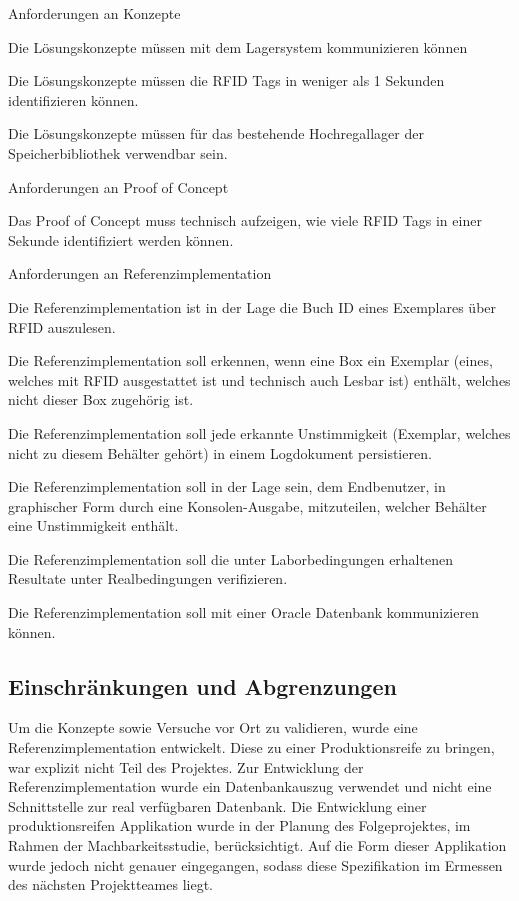 \begin{legal}
	\item Anforderungen an Konzepte
	\begin{legal}
		\item Die Lösungskonzepte müssen mit dem Lagersystem kommunizieren können
		\item Die Lösungskonzepte müssen die RFID Tags in weniger als 1 Sekunden identifizieren können.
		\item Die Lösungskonzepte müssen für das bestehende Hochregallager der Speicherbibliothek verwendbar sein.
	\end{legal}
	\item Anforderungen an Proof of Concept
	\begin{legal}
		\item Das Proof of Concept muss technisch aufzeigen, wie viele RFID Tags in einer Sekunde identifiziert werden können.
	\end{legal}
	\item Anforderungen an Referenzimplementation
	\begin{legal}
		\item Die Referenzimplementation ist in der Lage die Buch ID eines Exemplares über RFID auszulesen.
		\item Die Referenzimplementation soll erkennen, wenn eine Box ein Exemplar (eines, welches mit RFID ausgestattet ist und technisch auch Lesbar ist) enthält, welches nicht dieser Box zugehörig ist.
		\item Die Referenzimplementation soll jede erkannte Unstimmigkeit (Exemplar, welches nicht zu diesem Behälter gehört) in einem Logdokument persistieren.
		\item Die Referenzimplementation soll in der Lage sein, dem Endbenutzer, in graphischer Form durch eine Konsolen-Ausgabe, mitzuteilen, welcher Behälter eine Unstimmigkeit enthält.
		\item Die Referenzimplementation soll die unter Laborbedingungen erhaltenen Resultate unter Realbedingungen verifizieren.
		\item Die Referenzimplementation soll mit einer Oracle Datenbank kommunizieren können.
	\end{legal}
\end{legal}

\subsection{Einschränkungen und Abgrenzungen}
Um die Konzepte sowie Versuche vor Ort zu validieren, wurde eine Referenzimplementation entwickelt. Diese zu einer Produktionsreife zu bringen, war explizit nicht Teil des Projektes. Zur Entwicklung der Referenzimplementation wurde ein Datenbankauszug verwendet und nicht eine Schnittstelle zur real verfügbaren Datenbank. Die Entwicklung einer produktionsreifen Applikation wurde in der Planung des Folgeprojektes, im Rahmen der Machbarkeitsstudie, berücksichtigt. Auf die Form dieser Applikation wurde jedoch nicht genauer eingegangen, sodass diese Spezifikation im Ermessen des nächsten Projektteames liegt.

